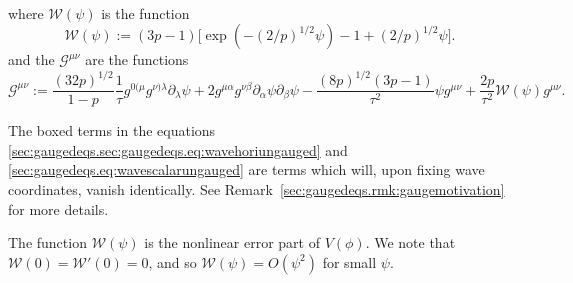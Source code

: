 \documentclass{article}
\newcommand{\mc}{\mathcal}
\newcommand{\pa}{\partial}
\begin{document}
\begin{lemma}
\begin{subequations}
\begin{align}
        \end{align}
    \end{subequations}
    where $\mc{W}(\psi)$ is the function
    \begin{equation}\label{sec:gaugedeqs.eq:potenterror}
        \mc{W}(\psi) :=  (3p-1)\big[\exp(-(2/p)^{1/2}\psi) -1 + (2/p)^{1/2}\psi\big].
    \end{equation}
    and the $\mc{G}^{\mu\nu}$ are the functions
    \begin{equation}\label{sec:gaugedeqs.eq:errorG}
        \mc{G}^{\mu\nu} := \frac{(32p)^{1/2}}{1-p}\frac{1}{\tau}g^{0(\mu}g^{\nu)\lambda}\pa_\lambda \psi + 2g^{\mu\alpha}g^{\nu\beta}\pa_\alpha\psi\pa_\beta\psi -\frac{(8p)^{1/2}(3p-1)}{\tau^2}\psi g^{\mu\nu} + \frac{2p}{\tau^2}\mc{W}(\psi)g^{\mu\nu}.
    \end{equation}
\end{lemma}
\begin{remark}
The boxed terms in the equations \eqref{sec:gaugedeqs.sec:gaugedeqs.eq:wavehoriungauged} and \eqref{sec:gaugedeqs.eq:wavescalarungauged} are terms which will, upon fixing wave coordinates, vanish identically. See Remark~\ref{sec:gaugedeqs.rmk:gaugemotivation} for more details.
\end{remark}
\begin{remark}
The function $\mc{W}(\psi)$ is the nonlinear error part of $V(\phi)$. We note that $\mc{W}(0) = \mc{W}'(0) = 0$, and so $\mc{W}(\psi) = O(\psi^2)$ for small $\psi$.
\end{remark}
\end{document}
